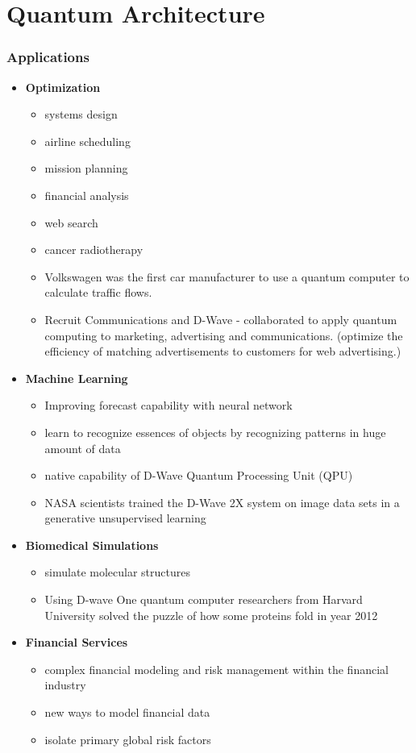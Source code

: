 \documentclass[xcolor=x11names,table]{beamer}
\begin{document}
\section{Quantum Architecture}

\begin{frame}[allowframebreaks]
\frametitle{Applications}
	\begin{itemize}
		\item \textbf{Optimization}
			\begin{itemize}
				\item systems design
				\item airline scheduling
				\item mission planning
				\item financial analysis
				\item web search
				\item cancer radiotherapy
				\item Volkswagen was the first car manufacturer to use a quantum computer to calculate traffic flows. 
				\item Recruit Communications and D-Wave - collaborated to apply quantum computing to marketing, advertising and communications. (optimize the efficiency of matching advertisements to customers for web advertising.)
			\end{itemize}
		\newpage
		
		\item \textbf{Machine Learning}
		\begin{itemize}
			\item Improving forecast capability with neural network
			\item learn to recognize essences of objects by recognizing patterns in huge amount of data
			\item native capability of D-Wave Quantum Processing Unit (QPU)
			\item NASA scientists trained the D-Wave 2X system on image data sets in a generative unsupervised learning 
		\end{itemize}
		\newpage
		
		\item \textbf{Biomedical Simulations}
			\begin{itemize}
				\item simulate molecular structures
				\item Using D-wave One quantum computer researchers from Harvard University solved the puzzle of how some proteins fold in year 2012 
			\end{itemize}
		
		\item \textbf{Financial Services}
			\begin{itemize}
				\item complex financial modeling and risk management within the financial industry
				\item new ways to model financial data
				\item isolate primary global risk factors
			\end{itemize}
	\end{itemize}
\end{frame}
\end{document}
